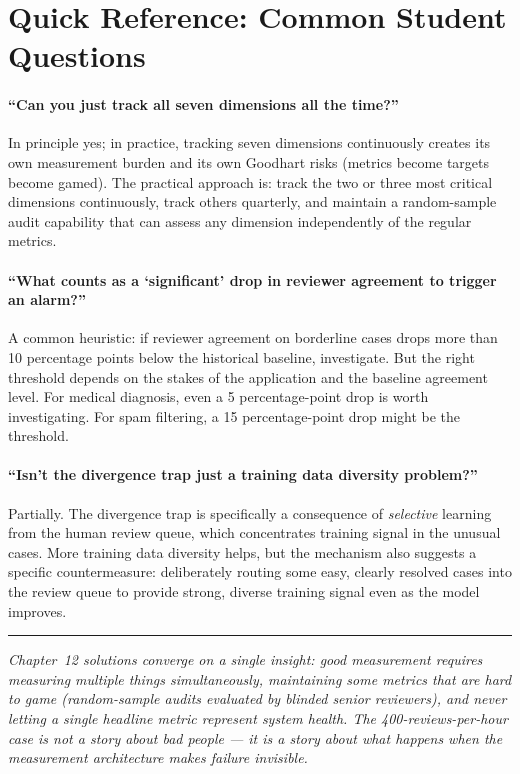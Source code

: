 \section{Quick Reference: Common Student Questions}

\paragraph{``Can you just track all seven dimensions all the time?''}
In principle yes; in practice, tracking seven dimensions continuously creates its own measurement burden and its own Goodhart risks (metrics become targets become gamed). The practical approach is: track the two or three most critical dimensions continuously, track others quarterly, and maintain a random-sample audit capability that can assess any dimension independently of the regular metrics.

\paragraph{``What counts as a `significant' drop in reviewer agreement to trigger an alarm?''}
A common heuristic: if reviewer agreement on borderline cases drops more than 10 percentage points below the historical baseline, investigate. But the right threshold depends on the stakes of the application and the baseline agreement level. For medical diagnosis, even a 5 percentage-point drop is worth investigating. For spam filtering, a 15 percentage-point drop might be the threshold.

\paragraph{``Isn't the divergence trap just a training data diversity problem?''}
Partially. The divergence trap is specifically a consequence of \emph{selective} learning from the human review queue, which concentrates training signal in the unusual cases. More training data diversity helps, but the mechanism also suggests a specific countermeasure: deliberately routing some easy, clearly resolved cases into the review queue to provide strong, diverse training signal even as the model improves.

\bigskip
\begin{center}
\rule{0.5\textwidth}{0.4pt}
\end{center}
\bigskip

\noindent\textit{Chapter~12 solutions converge on a single insight: good measurement requires measuring multiple things simultaneously, maintaining some metrics that are hard to game (random-sample audits evaluated by blinded senior reviewers), and never letting a single headline metric represent system health. The 400-reviews-per-hour case is not a story about bad people --- it is a story about what happens when the measurement architecture makes failure invisible.}

